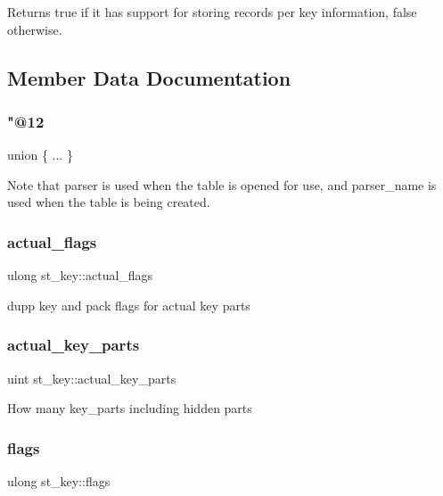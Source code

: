 \begin{DoxyReturn}{Returns}
true if it has support for storing records per key information, false otherwise. 
\end{DoxyReturn}


\subsection{Member Data Documentation}
\mbox{\label{structst__key_ac47864872e2973bbcd45370aa26ce812}} 
\subsubsection{\texorpdfstring{"@12}{@12}}
{\footnotesize\ttfamily union \{ ... \} }

Note that parser is used when the table is opened for use, and parser\+\_\+name is used when the table is being created. \mbox{\label{structst__key_ac21c3d5f4fe81d2a398c1ed80c755516}} 
\subsubsection{\texorpdfstring{actual\+\_\+flags}{actual\_flags}}
{\footnotesize\ttfamily ulong st\+\_\+key\+::actual\+\_\+flags}

dupp key and pack flags for actual key parts \mbox{\label{structst__key_ae6e21b5421c8c6f5a53fc5ec3dbeea80}} 
\subsubsection{\texorpdfstring{actual\+\_\+key\+\_\+parts}{actual\_key\_parts}}
{\footnotesize\ttfamily uint st\+\_\+key\+::actual\+\_\+key\+\_\+parts}

How many key\+\_\+parts including hidden parts \mbox{\label{structst__key_ae731249c40a20dc905cea7be9864ab39}} 
\subsubsection{\texorpdfstring{flags}{flags}}
{\footnotesize\ttfamily ulong st\+\_\+key\+::flags}

